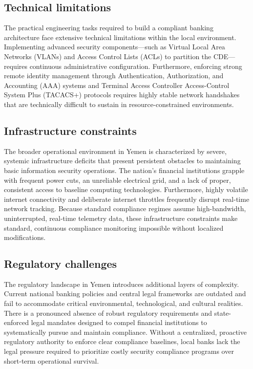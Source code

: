 \documentclass[12pt,a4paper,oneside]{report}
\begin{document}
	\subsection{Technical limitations}
	The practical engineering tasks required to build a compliant banking architecture face extensive technical limitations within the local environment. Implementing advanced security components—such as Virtual Local Area Networks (VLANs) and Access Control Lists (ACLs) to partition the CDE—requires continuous administrative configuration. Furthermore, enforcing strong remote identity management through Authentication, Authorization, and Accounting (AAA) systems and Terminal Access Controller Access-Control System Plus (TACACS+) protocols requires highly stable network handshakes that are technically difficult to sustain in resource-constrained environments.
	
	\subsection{Infrastructure constraints}
	The broader operational environment in Yemen is characterized by severe, systemic infrastructure deficits that present persistent obstacles to maintaining basic information security operations. The nation’s financial institutions grapple with frequent power cuts, an unreliable electrical grid, and a lack of proper, consistent access to baseline computing technologies. Furthermore, highly volatile internet connectivity and deliberate internet throttles frequently disrupt real-time network tracking. Because standard compliance regimes assume high-bandwidth, uninterrupted, real-time telemetry data, these infrastructure constraints make standard, continuous compliance monitoring impossible without localized modifications.
	
	\subsection{Regulatory challenges}
	The regulatory landscape in Yemen introduces additional layers of complexity. Current national banking policies and central legal frameworks are outdated and fail to accommodate critical environmental, technological, and cultural realities. There is a pronounced absence of robust regulatory requirements and state-enforced legal mandates designed to compel financial institutions to systematically pursue and maintain compliance. Without a centralized, proactive regulatory authority to enforce clear compliance baselines, local banks lack the legal pressure required to prioritize costly security compliance programs over short-term operational survival.
	
\end{document}
